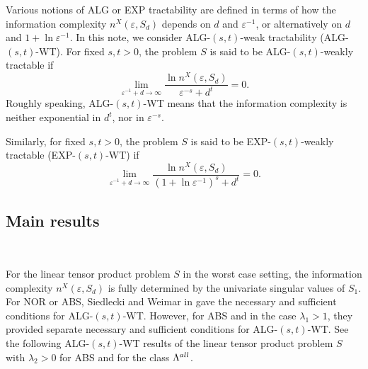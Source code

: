 \documentclass[10pt,a4paper]{amsart}
\numberwithin{equation}{section}
\def\vz{\varepsilon}
\def\lz{\lambda}
\begin{document}
Various notions of ALG or EXP tractability  are defined in terms
of how the information complexity $n^X(\vz,S_{d})$ depends on $d$
and $\vz^{-1}$, or alternatively on $d$ and $1+\ln \vz^{-1}$.  In
this note, we consider ALG-$(s,t)$-weak tractability
(ALG-$(s,t)$-WT). For fixed $s, t> 0$, the problem $S$ is said to
be ALG-$(s,t)$-weakly tractable
 if
\begin{equation*}
\lim\limits_{\varepsilon^{-1} + d \to \infty} \frac{\ln
n^{X}(\varepsilon, S_d)}{\varepsilon^{-s}+d^t} = 0.
\end{equation*}
Roughly speaking,  ALG-$(s, t)$-WT means that  the information
complexity is neither exponential in $d^t$, nor in $\vz^{-s}$.

Similarly, for fixed  $s, t> 0$, the problem $S$ is said to be
EXP-$(s,t)$-weakly tractable (EXP-$(s,t)$-WT) if
\begin{equation*}
\lim\limits_{\varepsilon^{-1} + d \to \infty} \frac{\ln
n^{X}(\varepsilon, S_d)}{(1+\ln\varepsilon^{-1})^s +d^t} = 0.
\end{equation*}






\subsection{Main results}\label{Main Results}

\

For the linear tensor product problem $S$ in the worst case
setting, the information complexity $n^{X}(\vz,S_d )$ is fully
determined by the univariate singular values  of $S_1$. For NOR or
ABS, Siedlecki and Weimar in \cite[Theorems 3.9 and 3.10]{SW15}
gave the necessary and sufficient conditions for ALG-$(s,t)$-WT.
However, for ABS and in the case $\lambda_1>1$, they provided
separate necessary and sufficient conditions for ALG-$(s,t)$-WT.
See the following ALG-$(s,t)$-WT results of the linear tensor
product problem $S$ with $\lz_2>0$ for ABS and for the class
$\Lambda^{\rm all}$.
\end{document}
